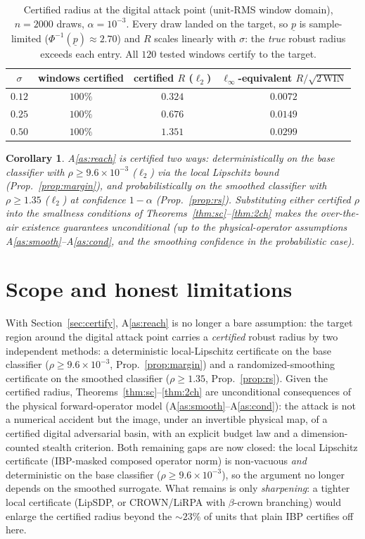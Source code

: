 \documentclass[11pt]{article}
\newtheorem{corollary}[theorem]{Corollary}
\theoremstyle{definition}
\begin{document}
\begin{table}[h]\centering
\begin{tabular}{cccc}
\hline
$\sigma$ & windows certified & certified $R$ ($\ell_2$) & $\ell_\infty$-equivalent $R/\sqrt{2\,\mathrm{WIN}}$\\
\hline
$0.12$ & $100\%$ & $0.324$ & $0.0072$\\
$0.25$ & $100\%$ & $0.676$ & $0.0149$\\
$0.50$ & $100\%$ & $1.351$ & $0.0299$\\
\hline
\end{tabular}
\caption{Certified radius at the digital attack point (unit-RMS window domain), $n=2000$
draws, $\alpha=10^{-3}$. Every draw landed on the target, so $\underline p$ is sample-limited
($\Phi^{-1}(\underline p)\approx2.70$) and $R$ scales linearly with $\sigma$: the \emph{true}
robust radius exceeds each entry. All $120$ tested windows certify to the target.}
\end{table}

\begin{corollary}
A\ref{as:reach} is certified two ways: \emph{deterministically} on the base classifier with
$\rho\ge 9.6\times10^{-3}$ ($\ell_2$) via the local Lipschitz bound (Prop.~\ref{prop:margin}),
and \emph{probabilistically} on the smoothed classifier with $\rho\ge 1.35$ ($\ell_2$) at
confidence $1-\alpha$ (Prop.~\ref{prop:rs}). Substituting either certified $\rho$ into the
smallness conditions of Theorems~\ref{thm:sc}--\ref{thm:2ch} makes the over-the-air existence
guarantees \emph{unconditional} (up to the physical-operator assumptions
A\ref{as:smooth}--A\ref{as:cond}, and the smoothing confidence in the probabilistic case).
\end{corollary}

\section*{Scope and honest limitations}
With Section~\ref{sec:certify}, A\ref{as:reach} is no longer a bare assumption: the target
region around the digital attack point carries a \emph{certified} robust radius by two independent
methods: a deterministic local-Lipschitz certificate on the base classifier
($\rho\ge9.6\times10^{-3}$, Prop.~\ref{prop:margin}) and a randomized-smoothing certificate on
the smoothed classifier ($\rho\ge1.35$, Prop.~\ref{prop:rs}). Given the certified radius,
Theorems~\ref{thm:sc}--\ref{thm:2ch}
are unconditional consequences of the physical forward-operator model
(A\ref{as:smooth}--A\ref{as:cond}): the attack is not a numerical accident but the image, under an
invertible physical map, of a certified digital adversarial basin, with an explicit budget law
and a dimension-counted stealth criterion. Both remaining gaps are now closed: the local
Lipschitz certificate (IBP-masked composed operator norm) is non-vacuous \emph{and}
deterministic on the base classifier ($\rho\ge9.6\times10^{-3}$), so the argument no longer
depends on the smoothed surrogate. What remains is only \emph{sharpening}: a tighter local
certificate (LipSDP, or CROWN/LiRPA with $\beta$-crown branching) would enlarge the certified
radius beyond the $\sim\!23\%$ of units that plain IBP certifies off here.
\end{document}
